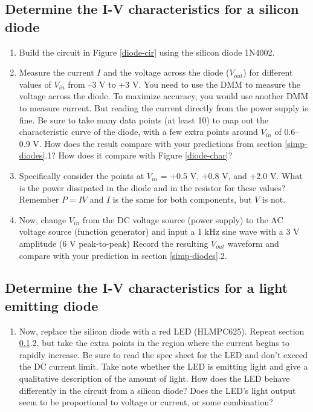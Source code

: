 \documentclass[10pt]{PhysLab1C} %
\begin{document}
\subsection{Determine the I-V characteristics for a silicon diode}

\label{iv-silicon}

\begin{enumerate}
    \item 
    Build the circuit in Figure \ref{diode-cir} using the silicon diode 1N4002.
    \item 
     Measure the current $I$ and the voltage across the diode ($V_{out}$) for different values of $V_{in}$
from –3 V to +3 V. You need to use the DMM to measure the voltage across the diode.
To maximize accuracy, you would use another DMM to measure current. But reading
the current directly from the power supply is fine. Be sure to take many data points (at
least 10) to map out the characteristic curve of the diode, with a few extra points
around $V_{in}$ of 0.6–0.9 V. How does the result compare with your predictions from
section \ref{simp-diodes}.1? How does it compare with Figure \ref{diode-char}?   
    \item 
           Specifically consider the points at $V_{in}$ = +0.5 V, +0.8 V, and +2.0 V. What is the power
dissipated in the diode and in the resistor for these values? Remember $P = IV$ and $I$ is the
same for both components, but $V$ is not. 
    \item 
    Now, change $V_{in}$ from the DC voltage source (power supply) to the AC voltage source
(function generator) and input a 1 kHz sine wave with a 3 V amplitude (6 V peak-to-peak) Record the resulting $V_{out}$ waveform and compare with your prediction in section \ref{simp-diodes}.2.
\end{enumerate}

\subsection{Determine the I-V characteristics for a light emitting diode}

\begin{enumerate}
    \item 
    Now, replace the silicon diode with a red LED (HLMPC625). Repeat section \ref{iv-silicon}.2, but take the
extra points in the region where the current begins to rapidly increase. Be sure to read
the spec sheet for the LED and don’t exceed the DC current limit. Take note whether the
LED is emitting light and give a qualitative description of the amount of light. How does
the LED behave differently in the circuit from a silicon diode? Does the LED’s light output
seem to be proportional to voltage or current, or some combination?
\end{enumerate}
\end{document}

